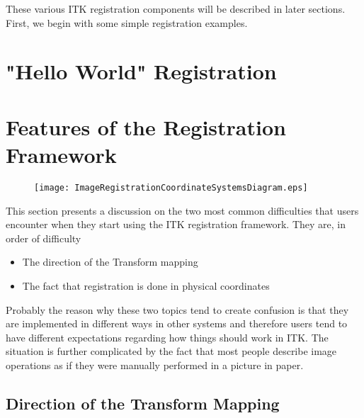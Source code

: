 These various ITK registration components will be described in later
sections.  First, we begin with some simple registration examples.

\section{"Hello World" Registration}
\label{sec:IntroductionImageRegistration}
\ifitkFullVersion

\fi

\section{Features of the Registration Framework}
\label{sec:FeaturesOfTheRegistrationFramework}

\begin{figure}
\center
\texttt{[image: ImageRegistrationCoordinateSystemsDiagram.eps]}
\label{fig:ImageRegistrationCoordinateSystemsDiagram}
\end{figure}


This section presents a discussion on the two most common difficulties that
users encounter when they start using the ITK registration framework. They are,
in order of difficulty

\begin{itemize}
\item The direction of the Transform mapping
\item The fact that registration is done in physical coordinates
\end{itemize}

Probably the reason why these two topics tend to create confusion is that they
are implemented in different ways in other systems and therefore users tend to
have different expectations regarding how things should work in ITK. The
situation is further complicated by the fact that most people describe image
operations as if they were manually performed in a picture in paper.

\subsection{Direction of the Transform Mapping}
\label{sec:DirectionOfTheTransformMapping}

